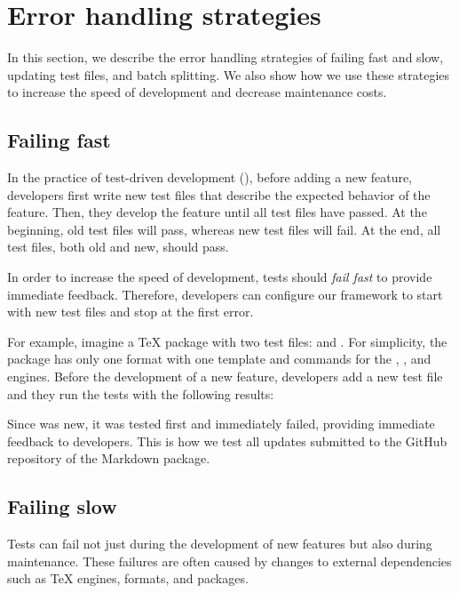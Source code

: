 \documentclass[final]{ltugboat}
\begin{document}
\section{Error handling strategies}
\label{sec:error-handling-strategies}

In this section, we describe the error handling strategies of failing fast and slow, updating test files, and batch splitting. We also show how we use these strategies to increase the speed of development and decrease maintenance costs.

\subsection{Failing fast}

In the practice of test-driven development (), before adding a new feature, developers first write new test files that describe the expected behavior of the feature. Then, they develop the feature until all test files have passed. At the beginning, old test files will pass, whereas new test files will fail. At the end, all test files, both old and new, should pass.

In order to increase the speed of development, tests should \emph{fail fast} to provide immediate feedback. Therefore, developers can configure our framework to start with new test files and stop at the first error.

For example, imagine a \TeX{} package with two test files:  and . For simplicity, the package has only one format with one template and commands for the , , and  engines. Before the development of a new feature, developers add a new test file  and they run the tests with the following results:

\medskip
\noindent
\begingroup
\centering

\par
\endgroup

\medskip
\noindent
Since  was new, it was tested first and immediately failed, providing immediate feedback to developers. This is how we test all updates submitted to the GitHub repository of the Markdown package.

\subsection{Failing slow}

Tests can fail not just during the development of new features but also during maintenance. These failures are often caused by changes to external dependencies such as \TeX{} engines, formats, and packages.
\end{document}
